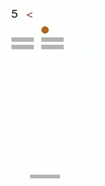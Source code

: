 \begin{figure}[h]
\begin{subfigure}[b]{0.18\textwidth}
	\end{subfigure}
	~ %
	\begin{subfigure}[b]{0.18\textwidth}
		\includegraphics[width=\textwidth]{images/breakout-33-rl-tb-2.png}
	\end{subfigure}

\end{figure}
